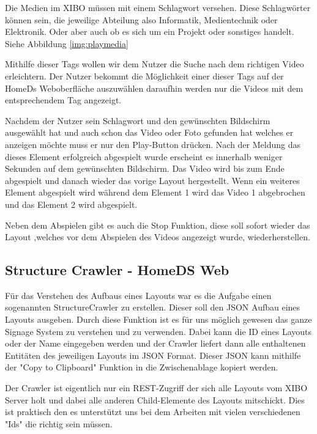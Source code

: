 Die Medien im XIBO müssen mit einem Schlagwort versehen. Diese Schlagwörter können sein, die jeweilige Abteilung also Informatik, Medientechnik oder Elektronik. Oder aber auch ob es sich um ein Projekt oder sonstiges handelt. Siehe Abbildung \ref{img:playmedia}

Mithilfe dieser Tags wollen wir dem Nutzer die Suche nach dem richtigen Video erleichtern. Der Nutzer bekommt die Möglichkeit einer dieser Tags auf der HomeDs Weboberfläche auszuwählen daraufhin werden nur die Videos mit dem entsprechendem Tag angezeigt.

Nachdem der Nutzer sein Schlagwort und den gewünschten Bildschirm ausgewählt hat und auch schon das Video oder Foto gefunden hat welches er anzeigen möchte muss er nur den Play-Button drücken. Nach der Meldung das dieses Element erfolgreich abgespielt wurde erscheint es innerhalb weniger Sekunden auf dem gewünschten Bildschirm. Das Video wird bis zum Ende abgespielt und danach wieder das vorige Layout hergestellt. Wenn ein weiteres Element abgespielt wird während dem Element 1 wird das Video 1 abgebrochen und das Element 2 wird abgespielt.

Neben dem Abspielen gibt es auch die Stop Funktion, diese soll sofort wieder das Layout ,welches vor dem Abspielen des Videos angezeigt wurde, wiederherstellen.


\subsection{Structure Crawler - HomeDS Web}\label{sec:javaeestructurecrawler}
Für das Verstehen des Aufbaus eines Layouts war es die Aufgabe einen sogenannten StructureCrawler zu erstellen. Dieser soll den JSON Aufbau eines Layouts ausgeben. Durch diese Funktion ist es für uns möglich gewesen das ganze Signage System zu verstehen und zu verwenden. Dabei kann die ID eines Layouts oder der Name eingegeben werden und der Crawler liefert dann alle enthaltenen Entitäten des jeweiligen Layouts im JSON Format. Dieser JSON kann mithilfe der "Copy to Clipboard" Funktion in die Zwischenablage kopiert werden.

Der Crawler ist eigentlich nur ein REST-Zugriff der sich alle Layouts vom XIBO Server holt und dabei alle anderen Child-Elemente des Layouts mitschickt. Dies ist praktisch den es unterstützt uns bei dem Arbeiten mit vielen verschiedenen "Ids" die richtig sein müssen.

